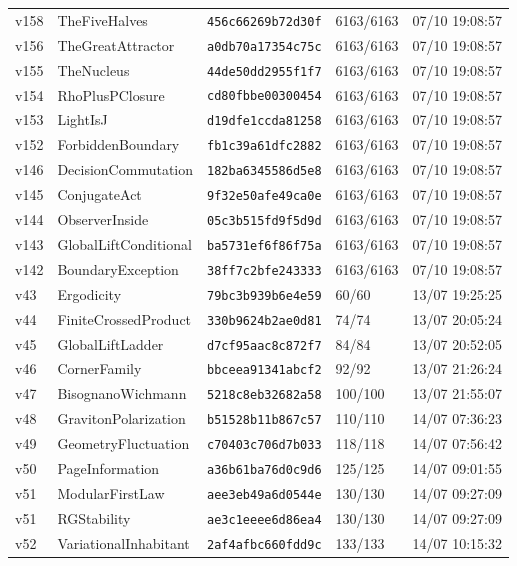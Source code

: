 \documentclass[11pt]{article}
\theoremstyle{definition}\newtheorem{deriv}{Derivation}
\begin{document}
{\begin{longtable}{@{}lllll@{}}
v158 & TheFiveHalves & \texttt{456c66269b72d30f} & 6163/6163 & 07/10 19:08:57 \\
v156 & TheGreatAttractor & \texttt{a0db70a17354c75c} & 6163/6163 & 07/10 19:08:57 \\
v155 & TheNucleus & \texttt{44de50dd2955f1f7} & 6163/6163 & 07/10 19:08:57 \\
v154 & RhoPlusPClosure & \texttt{cd80fbbe00300454} & 6163/6163 & 07/10 19:08:57 \\
v153 & LightIsJ & \texttt{d19dfe1ccda81258} & 6163/6163 & 07/10 19:08:57 \\
v152 & ForbiddenBoundary & \texttt{fb1c39a61dfc2882} & 6163/6163 & 07/10 19:08:57 \\
v146 & DecisionCommutation & \texttt{182ba6345586d5e8} & 6163/6163 & 07/10 19:08:57 \\
v145 & ConjugateAct & \texttt{9f32e50afe49ca0e} & 6163/6163 & 07/10 19:08:57 \\
v144 & ObserverInside & \texttt{05c3b515fd9f5d9d} & 6163/6163 & 07/10 19:08:57 \\
v143 & GlobalLiftConditional & \texttt{ba5731ef6f86f75a} & 6163/6163 & 07/10 19:08:57 \\
v142 & BoundaryException & \texttt{38ff7c2bfe243333} & 6163/6163 & 07/10 19:08:57 \\
v43 & Ergodicity & \texttt{79bc3b939b6e4e59} & 60/60 & 13/07 19:25:25 \\
v44 & FiniteCrossedProduct & \texttt{330b9624b2ae0d81} & 74/74 & 13/07 20:05:24 \\
v45 & GlobalLiftLadder & \texttt{d7cf95aac8c872f7} & 84/84 & 13/07 20:52:05 \\
v46 & CornerFamily & \texttt{bbceea91341abcf2} & 92/92 & 13/07 21:26:24 \\
v47 & BisognanoWichmann & \texttt{5218c8eb32682a58} & 100/100 & 13/07 21:55:07 \\
v48 & GravitonPolarization & \texttt{b51528b11b867c57} & 110/110 & 14/07 07:36:23 \\
v49 & GeometryFluctuation & \texttt{c70403c706d7b033} & 118/118 & 14/07 07:56:42 \\
v50 & PageInformation & \texttt{a36b61ba76d0c9d6} & 125/125 & 14/07 09:01:55 \\
v51 & ModularFirstLaw & \texttt{aee3eb49a6d0544e} & 130/130 & 14/07 09:27:09 \\
v51 & RGStability & \texttt{ae3c1eeee6d86ea4} & 130/130 & 14/07 09:27:09 \\
v52 & VariationalInhabitant & \texttt{2af4afbc660fdd9c} & 133/133 & 14/07 10:15:32 \\

\end{longtable}}
\end{document}
